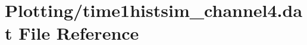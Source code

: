 \hypertarget{Plotting_2time1histsim__channel4_8dat}{}\section{Plotting/time1histsim\+\_\+channel4.dat File Reference}
\label{Plotting_2time1histsim__channel4_8dat}
